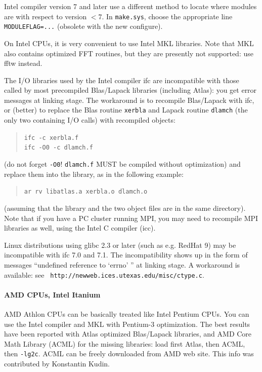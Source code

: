 \documentclass[12pt]{article}
\begin{document}
Intel compiler version 7 and later use a different method to locate
where modules are with respect to version $< 7$.  In {\tt make.sys},
choose the appropriate line {\tt MODULEFLAG=...} (obsolete with the new
configure).

On Intel CPUs, it is very convenient to use Intel MKL libraries.  Note
that MKL also contains optimized FFT routines, but they are presently
not supported: use fftw instead.

The I/O libraries used by the Intel compiler ifc are incompatible with
those called by most precompiled Blas/Lapack libraries (including
Atlas): you get error messages at linking stage. The workaround is to
recompile Blas/Lapack with ifc, or (better) to replace the Blas routine
{\tt xerbla} and Lapack routine {\tt dlamch} (the only two containing
I/O calls) with recompiled objects:
\begin{quote}
  {\tt ifc     -c xerbla.f} \\
  {\tt ifc -O0 -c dlamch.f}
\end{quote}
(do not forget {\tt -O0}! {\tt dlamch.f} MUST be compiled without
optimization) and replace them into the library, as in the following
example:
\begin{quote}
{\tt ar rv libatlas.a xerbla.o dlamch.o}
\end{quote}
(assuming that the library and the two object files are in the same
directory). Note that if you have a PC cluster running MPI, you may
need
to recompile MPI libraries as well, using the Intel C compiler (icc).

Linux distributions using glibc 2.3 or later (such as e.g. RedHat 9) may
be incompatible with ifc 7.0 and 7.1.  The incompatibility shows up in
the form of messages ``undefined reference to `errno' '' at linking
stage.  A workaround is available: see {\tt
http://newweb.ices.utexas.edu/misc/ctype.c}.

\paragraph{AMD CPUs, Intel Itanium}

AMD Athlon CPUs can be basically treated like Intel Pentium CPUs. You
can use the Intel compiler and MKL with Pentium-3 optimization. The best
results have been reported with Atlas optimized Blas/Lapack libraries,
and AMD Core Math Library (ACML) for the missing libraries: load first
Atlas, then ACML, then {\tt -lg2c}. ACML can be freely downloaded from
AMD web site.  This info was contributed by Konstantin Kudin.
\end{document}

